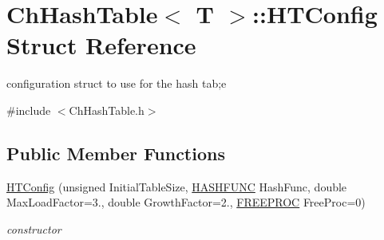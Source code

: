 \hypertarget{structChHashTable_1_1HTConfig}{\section{Ch\-Hash\-Table$<$ T $>$\-:\-:H\-T\-Config Struct Reference}
\label{structChHashTable_1_1HTConfig}
}


configuration struct to use for the hash tab;e  




{\ttfamily \#include $<$Ch\-Hash\-Table.\-h$>$}

\subsection*{Public Member Functions}
\begin{DoxyCompactItemize}
\item 
\hypertarget{structChHashTable_1_1HTConfig_aff3f3d677a41235fe36adfe50a88202b}{\hyperlink{structChHashTable_1_1HTConfig_aff3f3d677a41235fe36adfe50a88202b}{H\-T\-Config} (unsigned Initial\-Table\-Size, \hyperlink{ChHashTable_8h_a2e5c3d6d9eb14baf05abe0760e4a6a5a}{H\-A\-S\-H\-F\-U\-N\-C} Hash\-Func, double Max\-Load\-Factor=3., double Growth\-Factor=2., \hyperlink{classChHashTable_a4cdeb8c440ef53bf15304c154f2ca950}{F\-R\-E\-E\-P\-R\-O\-C} Free\-Proc=0)}\label{structChHashTable_1_1HTConfig_aff3f3d677a41235fe36adfe50a88202b}

\begin{DoxyCompactList}\small\item\em constructor \end{DoxyCompactList}\end{DoxyCompactItemize}
